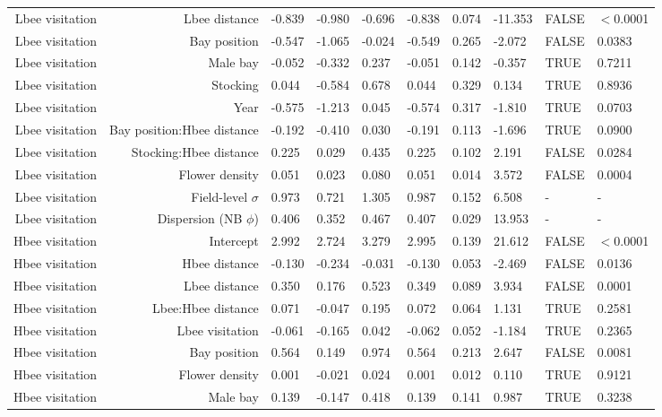 \begin{landscape}
\begin{longtable}{|r|r|l|l|l|l|l|l|l|l|}
    Lbee visitation & Lbee distance & -0.839 & -0.980 & -0.696 & -0.838 & 0.074 & -11.353 & FALSE & $<$0.0001 \\ 
    Lbee visitation & Bay position & -0.547 & -1.065 & -0.024 & -0.549 & 0.265 & -2.072 & FALSE & 0.0383 \\ 
    Lbee visitation & Male bay & -0.052 & -0.332 & 0.237 & -0.051 & 0.142 & -0.357 & TRUE & 0.7211 \\ 
    Lbee visitation & Stocking & 0.044 & -0.584 & 0.678 & 0.044 & 0.329 & 0.134 & TRUE & 0.8936 \\ 
    Lbee visitation & Year & -0.575 & -1.213 & 0.045 & -0.574 & 0.317 & -1.810 & TRUE & 0.0703 \\ 
    Lbee visitation & Bay position:Hbee distance & -0.192 & -0.410 & 0.030 & -0.191 & 0.113 & -1.696 & TRUE & 0.0900 \\ 
    Lbee visitation & Stocking:Hbee distance & 0.225 & 0.029 & 0.435 & 0.225 & 0.102 & 2.191 & FALSE & 0.0284 \\ 
    Lbee visitation & Flower density & 0.051 & 0.023 & 0.080 & 0.051 & 0.014 & 3.572 & FALSE & 0.0004 \\ 
    Lbee visitation & Field-level $\sigma$ & 0.973 & 0.721 & 1.305 & 0.987 & 0.152 & 6.508 &  - & -  \\ 
    Lbee visitation & Dispersion (NB $\phi$) & 0.406 & 0.352 & 0.467 & 0.407 & 0.029 & 13.953 &  - & -  \\ 
    \hline
    Hbee visitation & Intercept & 2.992 & 2.724 & 3.279 & 2.995 & 0.139 & 21.612 & FALSE & $<$0.0001 \\ 
    Hbee visitation & Hbee distance & -0.130 & -0.234 & -0.031 & -0.130 & 0.053 & -2.469 & FALSE & 0.0136 \\ 
    Hbee visitation & Lbee distance & 0.350 & 0.176 & 0.523 & 0.349 & 0.089 & 3.934 & FALSE & 0.0001 \\ 
    Hbee visitation & Lbee:Hbee distance & 0.071 & -0.047 & 0.195 & 0.072 & 0.064 & 1.131 & TRUE & 0.2581 \\ 
    Hbee visitation & Lbee visitation & -0.061 & -0.165 & 0.042 & -0.062 & 0.052 & -1.184 & TRUE & 0.2365 \\ 
    Hbee visitation & Bay position & 0.564 & 0.149 & 0.974 & 0.564 & 0.213 & 2.647 & FALSE & 0.0081 \\ 
    Hbee visitation & Flower density & 0.001 & -0.021 & 0.024 & 0.001 & 0.012 & 0.110 & TRUE & 0.9121 \\ 
    Hbee visitation & Male bay & 0.139 & -0.147 & 0.418 & 0.139 & 0.141 & 0.987 & TRUE & 0.3238 \\ 

\end{longtable}
\end{landscape}

